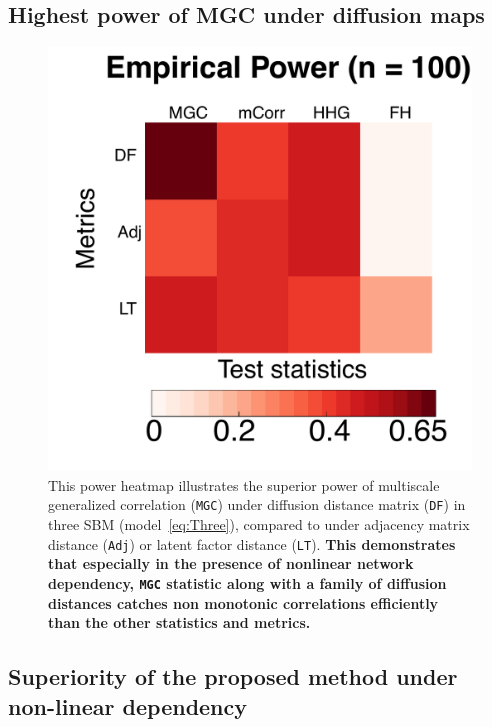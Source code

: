\documentclass[12pt]{article}
\begin{document}
\subsection*{Highest power of MGC under diffusion maps}

\begin{figure}
	\centering
	\includegraphics[width=0.4\paperwidth, height=0.4\paperwidth]{../Figure/ThreeSBM_results_simple.pdf}
	\caption{This power heatmap illustrates the superior power of multiscale generalized correlation (\texttt{MGC}) under diffusion distance matrix (\texttt{DF}) in three SBM (model~\ref{eq:Three}), compared to under adjacency matrix distance (\texttt{Adj}) or latent factor distance (\texttt{LT}). \textbf{This demonstrates that especially in the presence of nonlinear network dependency, \texttt{MGC} statistic along with a family of diffusion distances catches non monotonic correlations efficiently than the other statistics and metrics.}}
	\label{fig:threeSBM}
\end{figure}

\subsection*{Superiority of the proposed method under non-linear dependency}
\end{document}

